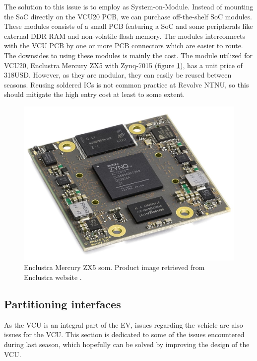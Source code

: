  
The solution to this issue is to employ as System-on-Module. Instead of mounting the SoC directly on the VCU20 PCB, we can purchase off-the-shelf SoC modules. These modules consists of a small PCB featuring a SoC and some peripherals like external DDR RAM and non-volatile flash memory. The modules interconnects with the VCU PCB by one or more PCB connectors which are easier to route. The downsides to using these modules is mainly the cost. The module utilized for VCU20, Enclustra Mercury ZX5 with Zynq-7015 (figure \ref{fig:zx5}), has a unit price of 318USD. However, as they are modular, they can easily be reused between seasons. Reusing soldered ICs is not common practice at Revolve NTNU, so this should mitigate the high entry cost at least to some extent.

\begin{figure}[H]
    \centering
    \includegraphics[width=.75\textwidth]{media/zx5.jpg}
    \caption{Enclustra Mercury ZX5 \acrshort{som}. Product image retrieved from Enclustra website \cite{zx5_img}.}
    \label{fig:zx5}
\end{figure}



\subsection{Partitioning interfaces}

As the VCU is an integral part of the EV, issues regarding the vehicle are also issues for the VCU. This section is dedicated to some of the issues encountered during last season, which hopefully can be solved by improving the design of the VCU.


